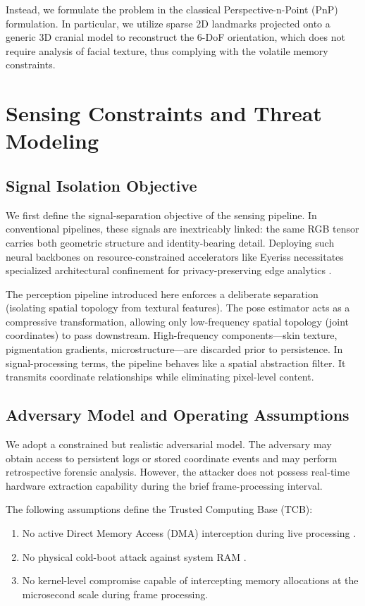 \documentclass[conference]{IEEEtran}
\begin{document}
Instead, we formulate the problem in the classical Perspective-n-Point (PnP) \cite{b15, b16} formulation. In particular, we utilize sparse 2D landmarks projected onto a generic 3D cranial model to reconstruct the 6-DoF orientation, which does not require analysis of facial texture, thus complying with the volatile memory constraints.

\section{Sensing Constraints and Threat Modeling}

\subsection{Signal Isolation Objective}
We first define the signal-separation objective of the sensing pipeline. In conventional pipelines, these signals are inextricably linked: the same RGB tensor carries both geometric structure and identity-bearing detail. Deploying such neural backbones on resource-constrained accelerators like Eyeriss \cite{b24} necessitates specialized architectural confinement for privacy-preserving edge analytics \cite{b26}.

The perception pipeline introduced here enforces a deliberate separation (isolating spatial topology from textural features). The pose estimator acts as a compressive transformation, allowing only low-frequency spatial topology (joint coordinates) to pass downstream. High-frequency components—skin texture, pigmentation gradients, microstructure—are discarded prior to persistence. In signal-processing terms, the pipeline behaves like a spatial abstraction filter. It transmits coordinate relationships while eliminating pixel-level content.

\subsection{Adversary Model and Operating Assumptions}
We adopt a constrained but realistic adversarial model. The adversary may obtain access to persistent logs or stored coordinate events and may perform retrospective forensic analysis. However, the attacker does not possess real-time hardware extraction capability during the brief frame-processing interval.

The following assumptions define the Trusted Computing Base (TCB):
\begin{enumerate}
    \item No active Direct Memory Access (DMA) interception during live processing \cite{b20}.
    \item No physical cold-boot attack against system RAM \cite{b19}.
    \item No kernel-level compromise capable of intercepting memory allocations at the microsecond scale during frame processing.
\end{enumerate}
\end{document}
